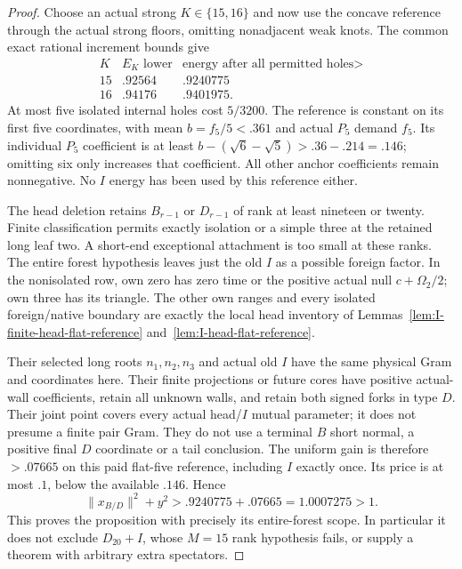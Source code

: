 \documentclass[11pt]{article}
\theoremstyle{definition}
\theoremstyle{remark}
\newcommand{\norm}[1]{\lVert #1\rVert}
\begin{document}
\begin{proof}
Choose an actual strong $K\in\{15,16\}$ and now use the concave
reference through the actual strong floors, omitting nonadjacent
weak knots. The common exact rational increment bounds give
\[
\begin{array}{c|c|c}
K&E_K\text{ lower}&\text{energy after all permitted holes}>\\\hline
15&.92564&.9240775\\16&.94176&.9401975 .
\end{array}
\]
At most five isolated internal holes cost $5/3200$. The reference
is constant on its first five coordinates, with mean
$b=f_5/5<.361$ and actual $P_5$ demand $f_5$.
Its individual $P_5$ coefficient is at least
$b-(\sqrt6-\sqrt5)>.36-.214=.146$; omitting six only increases
that coefficient. All other anchor coefficients remain nonnegative.
No $I$ energy has been used by this reference either.

The head deletion retains $B_{r-1}$ or $D_{r-1}$ of rank at least
nineteen or twenty. Finite classification permits exactly isolation
or a simple three at the retained long leaf two. A short-end
exceptional attachment is too small at these ranks. The entire
forest hypothesis leaves just the old $I$ as a possible foreign
factor. In the nonisolated row, own zero has zero time or the
positive actual null $c+\Omega_2/2$; own three has its triangle.
The other own ranges and every isolated foreign/native boundary are
exactly the local head inventory of
Lemmas~\ref{lem:I-finite-head-flat-reference}
and~\ref{lem:I-head-flat-reference}.

Their selected long roots $n_1,n_2,n_3$ and actual old $I$ have
the same physical Gram and coordinates here. Their finite projections
or future cores have positive actual-wall coefficients, retain all
unknown walls, and retain both signed forks in type $D$. Their
joint point covers every actual head/$I$ mutual parameter; it does
not presume a finite pair Gram. They do not use a terminal $B$ short
normal, a positive final $D$ coordinate or a tail conclusion.
The uniform gain is therefore $>.07665$ on this paid flat-five
reference, including $I$ exactly once. Its price is at most $.1$,
below the available $.146$. Hence
\[
 \norm{x_{B/D}}^2+y^2>.9240775+.07665=1.0007275>1.
\]
This proves the proposition with precisely its entire-forest scope.
In particular it does not exclude $D_{20}+I$, whose $M=15$ rank
hypothesis fails, or supply a theorem with arbitrary extra spectators.
\end{proof}
\end{document}
